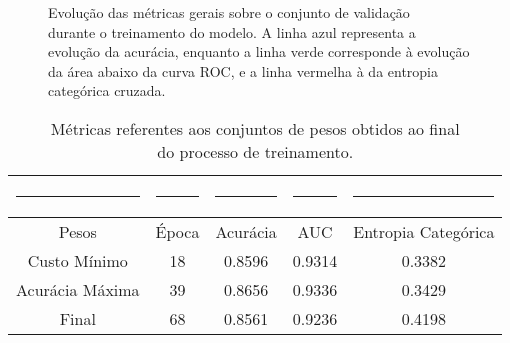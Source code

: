 \begin{figure}[ht]
    \centering
    \caption{Evolução das métricas gerais sobre o conjunto de validação\\ durante o treinamento do modelo. A linha azul representa a evolução da acurácia, enquanto a linha verde corresponde à evolução da área abaixo da curva ROC, e a linha vermelha à da entropia categórica cruzada.}
    \label{fig:general-metrics-val}
\end{figure}

\begin{table}[ht]
    \centering
    \begin{tabular}{|c|c|c|c|c|}
        \rule{1cm}{0pt}&\rule{1.5cm}{0pt}&\rule{1.5cm}{0pt}&\rule{1.5cm}{0pt}&\rule{1cm}{0pt}\\[-\arraystretch\normalbaselineskip]
        \toprule
        Pesos & Época & Acurácia & AUC & Entropia Categórica \\
        \toprule
        Custo Mínimo & 18 & 0.8596 & 0.9314 & 0.3382 \\
        \hline
        Acurácia Máxima & 39 & 0.8656 & 0.9336 & 0.3429 \\
        \hline
        Final & 68 & 0.8561 & 0.9236 & 0.4198 \\
        \bottomrule
    \end{tabular}
    \caption{Métricas referentes aos conjuntos de pesos obtidos ao final\\ do processo de treinamento.}
    \label{tab:general-metrics-val}
\end{table}

